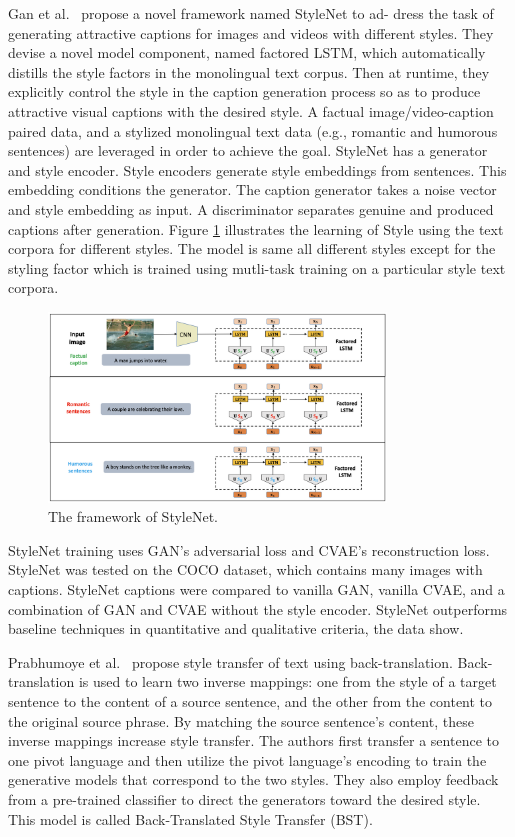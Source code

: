 \documentclass[akbc,twoside,11pt]{article}
\begin{document}
Gan et al.~\cite{gan2017stylenet} propose a novel framework named StyleNet to ad- dress the task of generating attractive captions for images and videos with different styles. They devise a novel model component, named factored LSTM, which automatically distills the style factors in the monolingual text corpus. Then at runtime, they explicitly control the style in the caption generation process so as to produce attractive visual captions with the desired style. A factual image/video-caption paired data, and a stylized monolingual text data (e.g., romantic and humorous sentences) are leveraged in order to achieve the goal. StyleNet has a generator and style encoder. Style encoders generate style embeddings from sentences. This embedding conditions the generator. The caption generator takes a noise vector and style embedding as input. A discriminator separates genuine and produced captions after generation. Figure \ref{fig:stylenet} illustrates the learning of Style using the text corpora for different styles. The model is same all different styles except for the styling factor which is trained using mutli-task training on a particular style text corpora.

\begin{figure}[h]
    \centering
    \includegraphics[width=0.8\textwidth]{assets/stylenet}
    \caption{The framework of StyleNet.}
    \label{fig:stylenet}
\end{figure}

StyleNet training uses GAN's adversarial loss and CVAE's reconstruction loss. StyleNet was tested on the COCO dataset, which contains many images with captions. StyleNet captions were compared to vanilla GAN, vanilla CVAE, and a combination of GAN and CVAE without the style encoder. StyleNet outperforms baseline techniques in quantitative and qualitative criteria, the data show.

Prabhumoye et al.~\cite{prabhumoye2018style} propose style transfer of text using back-translation. Back-translation is used to learn two inverse mappings: one from the style of a target sentence to the content of a source sentence, and the other from the content to the original source phrase. By matching the source sentence's content, these inverse mappings increase style transfer. The authors first transfer a sentence to one pivot language and then utilize the pivot language's encoding to train the generative models that correspond to the two styles. They also employ feedback from a pre-trained classifier to direct the generators toward the desired style. This model is called Back-Translated Style Transfer (BST). 
\end{document}
